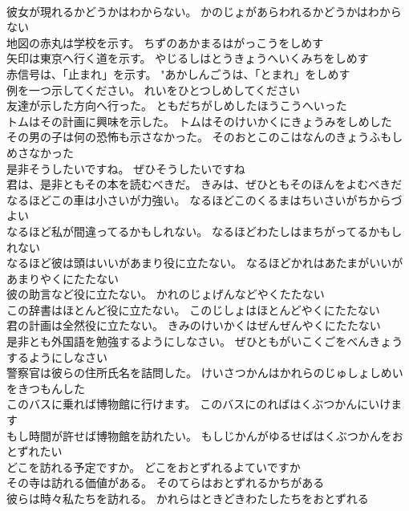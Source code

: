 \documentclass[8pt]{extreport}
\begin{document}
\begin{CJK}{UTF8}{min}
\\	彼女が現れるかどうかはわからない。	かのじょがあらわれるかどうかはわからない 
\\	地図の赤丸は学校を示す。	ちずのあかまるはがっこうをしめす 
\\	矢印は東京へ行く道を示す。	やじるしはとうきょうへいくみちをしめす 
\\	赤信号は、「止まれ」を示す。	"あかしんごうは、「とまれ」をしめす 
\\	例を一つ示してください。	れいをひとつしめしてください 
\\	友達が示した方向へ行った。	ともだちがしめしたほうこうへいった 
\\	トムはその計画に興味を示した。	トムはそのけいかくにきょうみをしめした 
\\	その男の子は何の恐怖も示さなかった。	そのおとこのこはなんのきょうふもしめさなかった 
\\	是非そうしたいですね。	ぜひそうしたいですね 
\\	君は、是非ともその本を読むべきだ。	きみは、ぜひともそのほんをよむべきだ 
\\	なるほどこの車は小さいが力強い。	なるほどこのくるまはちいさいがちからづよい 
\\	なるほど私が間違ってるかもしれない。	なるほどわたしはまちがってるかもしれない 
\\	なるほど彼は頭はいいがあまり役に立たない。	なるほどかれはあたまがいいがあまりやくにたたない 
\\	彼の助言など役に立たない。	かれのじょげんなどやくたたない 
\\	この辞書はほとんど役に立たない。	このじしょはほとんどやくにたたない 
\\	君の計画は全然役に立たない。	きみのけいかくはぜんぜんやくにたたない 
\\	是非とも外国語を勉強するようにしなさい。	ぜひともがいこくごをべんきょうするようにしなさい 
\\	警察官は彼らの住所氏名を詰問した。	けいさつかんはかれらのじゅしょしめいをきつもんした 
\\	このバスに乗れば博物館に行けます。	このバスにのればはくぶつかんにいけます 
\\	もし時間が許せば博物館を訪れたい。	もしじかんがゆるせばはくぶつかんをおとずれたい 
\\	どこを訪れる予定ですか。	どこをおとずれるよていですか 
\\	その寺は訪れる価値がある。	そのてらはおとずれるかちがある 
\\	彼らは時々私たちを訪れる。	かれらはときどきわたしたちをおとずれる 

\end{CJK}
\end{document}
